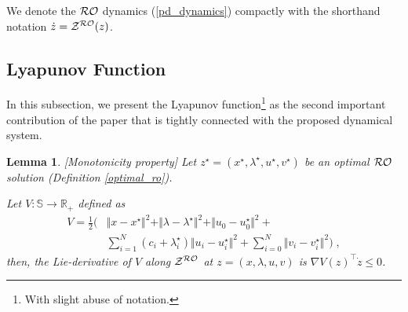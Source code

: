 \documentclass[journal,twoside,web]{ieeecolor}
\newtheorem{lemma}{Lemma}
\begin{document}
We denote the ${\cal RO}$ dynamics (\ref{pd_dynamics}) compactly with the shorthand notation $\dot z={\cal Z}^{\cal RO}(z)$.

\subsection{Lyapunov Function}
In this subsection, we present the Lyapunov function\footnote{With slight abuse of notation.} as the second important contribution of the paper that is tightly connected with the proposed dynamical system.

\begin{lemma} \label{monotonicity} [Monotonicity property]
Let $z^\star=(x^\star,\lambda^\star,u^\star, v^\star)$ be an optimal ${\cal RO}$ solution (Definition \ref{optimal_ro}).
 
 Let  $V: {\mathbb S}\to \mathbb{R}_+ $ defined as
\begin{align}
V=\frac{1}{2}\big( &\Vert x-x^\star\Vert^2+\Vert\lambda-\lambda^\star \Vert^2+\Vert u_0-u_0^\star\Vert^2+\nonumber \\
&\sum_{i=1}^N(c_i+\lambda_i^\star) \Vert u_i-u_i^\star\Vert^2+ \sum_{i=0}^N\Vert v_i-v_i^\star\Vert^2\big)\;, \label{Lya_function}
\end{align}
then, the Lie-derivative of $V$ along ${\cal Z}^{\cal RO}$ at $z=(x,\lambda,u,v)$ is $\nabla V(z)^\top \dot z\leq 0$.
\end{lemma}
\end{document}
